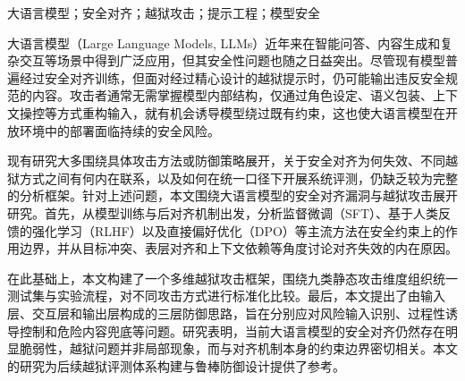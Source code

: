 {}

\begin{cnabstract}{大语言模型；安全对齐；越狱攻击；提示工程；模型安全}

大语言模型（Large Language Models, LLMs）近年来在智能问答、内容生成和复杂交互等场景中得到广泛应用，但其安全性问题也随之日益突出。尽管现有模型普遍经过安全对齐训练，但面对经过精心设计的越狱提示时，仍可能输出违反安全规范的内容。攻击者通常无需掌握模型内部结构，仅通过角色设定、语义包装、上下文操控等方式重构输入，就有机会诱导模型绕过既有约束，这也使大语言模型在开放环境中的部署面临持续的安全风险。

现有研究大多围绕具体攻击方法或防御策略展开，关于安全对齐为何失效、不同越狱方式之间有何内在联系，以及如何在统一口径下开展系统评测，仍缺乏较为完整的分析框架。针对上述问题，本文围绕大语言模型的安全对齐漏洞与越狱攻击展开研究。首先，从模型训练与后对齐机制出发，分析监督微调（SFT）、基于人类反馈的强化学习（RLHF）以及直接偏好优化（DPO）等主流方法在安全约束上的作用边界，并从目标冲突、表层对齐和上下文依赖等角度讨论对齐失效的内在原因。
    
在此基础上，本文构建了一个多维越狱攻击框架，围绕九类静态攻击维度组织统一测试集与实验流程，对不同攻击方式进行标准化比较。最后，本文提出了由输入层、交互层和输出层构成的三层防御思路，旨在分别应对风险输入识别、过程性诱导控制和危险内容兜底等问题。研究表明，当前大语言模型的安全对齐仍然存在明显脆弱性，越狱问题并非局部现象，而与对齐机制本身的约束边界密切相关。本文的研究为后续越狱评测体系构建与鲁棒防御设计提供了参考。
\end{cnabstract}
\newpage

{}

